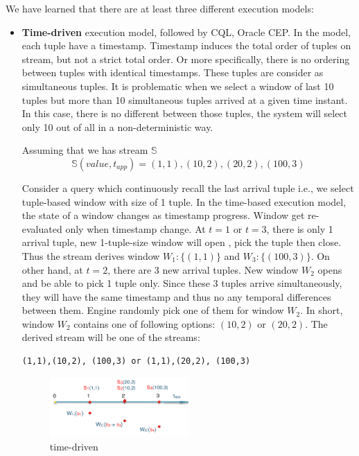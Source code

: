 We have learned that there are at least three different execution models:
\begin{itemize}
	\item \textbf{Time-driven} execution model, followed by CQL, Oracle CEP. In the model, each tuple have a timestamp. Timestamp induces the total order of tuples on stream, but not a strict total order. Or more specifically, there is no ordering between tuples with identical timestamps. These tuples are consider as simultaneous tuples. It is problematic when we select a window of last 10 tuples but more than 10 simultaneous tuples arrived at a given time instant. In this case, there is no different between those tuples, the system will select only 10 out of all in a non-deterministic way.
	
Assuming that we has stream $\mathbb{S}$
	\begin{equation}
			\mathbb{S}(value, t_{app}) = (1,1),(10,2),(20,2), (100,3)
	\end{equation}
	

	
Consider a query which continuously recall the last arrival tuple i.e., we select tuple-based window with size of 1 tuple. In the time-based execution model,  the state of a window changes as timestamp progress. Window get re-evaluated only when timestamp change. At $t=1$ or $t=3$, there is only 1 arrival tuple, new 1-tuple-size window will open , pick the tuple then close. Thus the stream derives window $W_1: \{(1,1)\}$ and $W_3: \{(100,3)\}$. On other hand, at $t=2$, there are 3 new arrival tuples. New window $W_2$ opens and be able to pick 1 tuple only. Since these 3 tuples arrive simultaneously, they will have the same timestamp and thus no any temporal differences between them.
Engine randomly pick one of them for window $W_2$. In short, window $W_2$ contains one of following options: $(10,2)$ or $(20,2)$. The derived stream will be one of the streams:
\begin{verbatim}
(1,1),(10,2), (100,3) or (1,1),(20,2), (100,3)
\end{verbatim}

\begin{figure}[htbp!] 
\centering    
\includegraphics[width=0.5\textwidth]{time-driven}
\caption{time-driven}
\label{fig:time-driven}
\end{figure}
	

\end{itemize}
